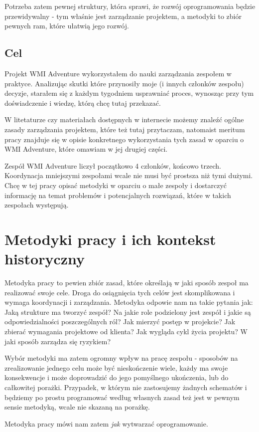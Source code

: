\documentclass{article}
\begin{document}
Potrzeba zatem pewnej struktury, która sprawi, że rozwój oprogramowania będzie przewidywalny - tym właśnie jest zarządzanie projektem, a metodyki to zbiór pewnych ram, które ułatwią jego rozwój.

\subsection{Cel}
Projekt WMI Adventure wykorzystałem do nauki zarządzania zespołem w praktyce. Analizując skutki które przynosiły moje (i innych członków zespołu) decyzje, starałem się z każdym tygodniem usprawniać
proces, wynosząc przy tym doświadczenie i  wiedzę, którą chcę tutaj przekazać.

W litetaturze czy materiałach dostępnych w internecie możemy znaleźć ogólne zasady zarządzania projektem, które też tutaj przytaczam, natomaist
meritum pracy znajduje się w opisie konkretnego wykorzystania tych zasad w oparciu o WMI Adventure, które omawiam w jej drugiej części.

Zespół WMI Adventure liczył początkowo 4 członków, końcowo trzech. Koordynacja mniejszymi zespołami wcale nie musi być prostsza niż tymi dużymi. Chcę w tej pracy opisać metodyki w oparciu o małe zespoły i dostarczyć informację na temat problemów i potencjalnych rozwiązań, które w takich zespołach
występują.

\section{Metodyki pracy i ich kontekst historyczny}
Metodyka pracy to pewien zbiór zasad, które określają w jaki sposób zespoł ma realizować swoje cele. Droga do osiągnięcia tych celów jest skomplikowana i wymaga koordynacji i zarządzania. Metodyka odpowie nam na takie pytania jak: Jaką strukture ma tworzyć zespół? Na jakie role podzielony jest zespół i jakie są odpowiedzialności poszczególnych ról? Jak mierzyć postęp w projekcie? Jak zbierać wymagania projektowe od klienta? Jak wygląda cykl życia projektu? W jaki sposób zarządza się ryzykiem?

Wybór metodyki ma zatem ogromny wpływ na pracę zespołu - sposobów na zrealizowanie jednego celu może być nieskończenie wiele, każdy ma swoje konsekwencje i może doprowadzić do jego pomyślnego ukończenia, lub do całkowitej porażki. Przypadek, w którym nie zastosujemy żadnych schematów i będziemy po prostu programować według własnych zasad też jest w pewnym sensie metodyką, wcale nie skazaną na porażkę.

Metodyka pracy mówi nam zatem \textit{jak} wytwarzać oprogramowanie.
\end{document}
